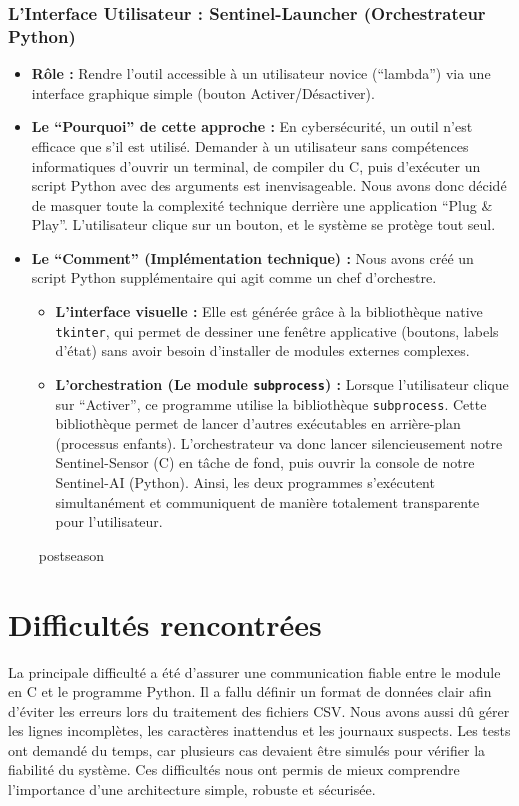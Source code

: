 \documentclass[a4paper, 12pt, twoside]{article}
\begin{document}
\subsubsection*{L'Interface Utilisateur : Sentinel-Launcher (Orchestrateur Python)}
\begin{itemize}
    \item \textbf{Rôle :} Rendre l'outil accessible à un utilisateur novice (``lambda'') via une interface graphique simple (bouton Activer/Désactiver).
    \item \textbf{Le ``Pourquoi'' de cette approche :} En cybersécurité, un outil n'est efficace que s'il est utilisé. Demander à un utilisateur sans compétences informatiques d'ouvrir un terminal, de compiler du C, puis d'exécuter un script Python avec des arguments est inenvisageable. Nous avons donc décidé de masquer toute la complexité technique derrière une application ``Plug \& Play''. L'utilisateur clique sur un bouton, et le système se protège tout seul.
    \item \textbf{Le ``Comment'' (Implémentation technique) :} Nous avons créé un script Python supplémentaire qui agit comme un chef d'orchestre.
    \begin{itemize}
        \item \textbf{L'interface visuelle :} Elle est générée grâce à la bibliothèque native \texttt{tkinter}, qui permet de dessiner une fenêtre applicative (boutons, labels d'état) sans avoir besoin d'installer de modules externes complexes.
        \item \textbf{L'orchestration (Le module \texttt{subprocess}) :} Lorsque l'utilisateur clique sur ``Activer'', ce programme utilise la bibliothèque \texttt{subprocess}. Cette bibliothèque permet de lancer d'autres exécutables en arrière-plan (processus enfants). L'orchestrateur va donc lancer silencieusement notre Sentinel-Sensor (C) en tâche de fond, puis ouvrir la console de notre Sentinel-AI (Python). Ainsi, les deux programmes s'exécutent simultanément et communiquent de manière totalement transparente pour l'utilisateur.
    \end{itemize}
\ postseason
\end{itemize}

\section{Difficultés rencontrées}
La principale difficulté a été  d’assurer une communication fiable entre le module en
C et le programme Python. Il a fallu définir un format de données clair afin d’éviter
les erreurs lors du traitement des fichiers CSV. Nous avons aussi dû gérer les lignes
incomplètes, les caractères inattendus et les journaux suspects. Les tests ont demandé
du temps, car plusieurs cas devaient être simulés pour vérifier la fiabilité du système.
Ces difficultés nous ont permis de mieux comprendre l’importance d’une architecture
simple, robuste et sécurisée.
\end{document}

